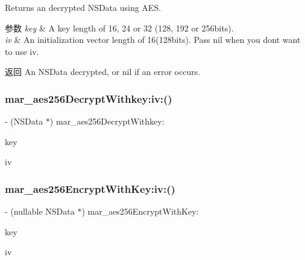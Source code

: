 Returns an decrypted N\+S\+Data using A\+ES.


\begin{DoxyParams}{参数}
{\em key} & A key length of 16, 24 or 32 (128, 192 or 256bits).\\
\hline
{\em iv} & An initialization vector length of 16(128bits). Pass nil when you don\textquotesingle{}t want to use iv.\\
\hline
\end{DoxyParams}
\begin{DoxyReturn}{返回}
An N\+S\+Data decrypted, or nil if an error occurs. 
\end{DoxyReturn}
\mbox{\label{category_n_s_data_07_m_a_r_e_x_08_a0f1f07861aa1c9b087872118b1bae4bd}} 
\subsubsection{\texorpdfstring{mar\+\_\+aes256\+Decrypt\+Withkey\+:iv\+:()}{mar\_aes256DecryptWithkey:iv:()}\hspace{0.1cm}{\footnotesize\ttfamily [2/2]}}
{\footnotesize\ttfamily -\/ (N\+S\+Data $\ast$) mar\+\_\+aes256\+Decrypt\+Withkey\+: \begin{DoxyParamCaption}\item[{(N\+S\+Data $\ast$)}]{key }\item[{iv:(N\+S\+Data $\ast$)}]{iv }\end{DoxyParamCaption}\hspace{0.3cm}{\ttfamily [implementation]}}

\mbox{\label{category_n_s_data_07_m_a_r_e_x_08_a10ef14946872abbaa078d6c64d93cc85}} 
\subsubsection{\texorpdfstring{mar\+\_\+aes256\+Encrypt\+With\+Key\+:iv\+:()}{mar\_aes256EncryptWithKey:iv:()}\hspace{0.1cm}{\footnotesize\ttfamily [1/2]}}
{\footnotesize\ttfamily -\/ (nullable N\+S\+Data $\ast$) mar\+\_\+aes256\+Encrypt\+With\+Key\+: \begin{DoxyParamCaption}\item[{(N\+S\+Data $\ast$)}]{key }\item[{iv:(nullable N\+S\+Data $\ast$)}]{iv }\end{DoxyParamCaption}}

